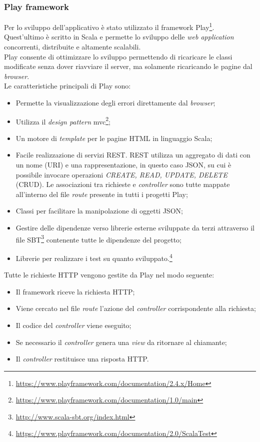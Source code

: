 \subsubsection*{Play framework}
Per lo sviluppo dell'applicativo è stato utilizzato il \gls{framework} Play\footnote{\url{https://www.playframework.com/documentation/2.4.x/Home}}. Quest'ultimo è scritto in Scala e permette lo sviluppo delle \textit{web application} concorrenti, distribuite e altamente scalabili. \\
Play consente di ottimizzare lo sviluppo permettendo di ricaricare le classi modificate senza dover riavviare il server, ma solamente ricaricando le pagine dal \textit{browser}.\\
Le caratteristiche principali di Play sono:
\begin{itemize}
	\item Permette la visualizzazione degli errori direttamente dal \textit{browser};
	\item Utilizza il \textit{design pattern} \gls{mvc}\footnote{\url{https://www.playframework.com/documentation/1.0/main}};
	\item Un motore di \textit{template} per le pagine HTML in linguaggio Scala;
	\item Facile realizzazione di servizi \gls{REST}. \gls{REST} utilizza un aggregato di dati con un nome (\gls{URI}) e una rappresentazione, in questo caso \gls{JSON}, su cui è possibile invocare operazioni \textit{CREATE, READ, UPDATE, DELETE} (CRUD). Le associazioni tra richieste e \textit{controller} sono tutte mappate all'interno del file \textit{route} presente in tutti i progetti Play;
	\item Classi per facilitare la manipolazione di oggetti \gls{JSON};
	\item Gestire delle dipendenze verso librerie esterne sviluppate da terzi attraverso il file SBT\footnote{\url{http://www.scala-sbt.org/index.html}} contenente tutte le dipendenze del progetto;
	\item Librerie per realizzare i test su quanto sviluppato.\footnote{\url{https://www.playframework.com/documentation/2.0/ScalaTest}}
\end{itemize}
Tutte le richieste HTTP vengono gestite da Play nel modo seguente:
\begin{itemize}
	\item Il \gls{framework} riceve la richiesta HTTP;
	\item Viene cercato nel file \textit{route} l'azione del \textit{controller} corrispondente alla richiesta;
	\item Il codice del \textit{controller} viene eseguito;
	\item Se necessario il \textit{controller} genera una \textit{view} da ritornare al chiamante;
	\item Il \textit{controller} restituisce una risposta HTTP.
\end{itemize}
